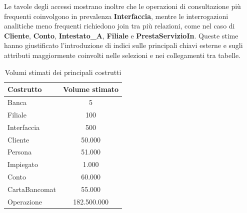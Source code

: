 Le tavole degli accessi mostrano inoltre che le operazioni di consultazione più frequenti coinvolgono in prevalenza \textbf{Interfaccia}, mentre le interrogazioni analitiche meno frequenti richiedono join tra più relazioni, come nel caso di \textbf{Cliente}, \textbf{Conto}, \textbf{Intestato\_A}, \textbf{Filiale} e \textbf{PrestaServizioIn}. Queste stime hanno giustificato l'introduzione di indici sulle principali chiavi esterne e sugli attributi maggiormente coinvolti nelle selezioni e nei collegamenti tra tabelle.

\begin{table}[H]
  \centering
  \begin{tabular}{|l|c|}
    \hline
    Costrutto & Volume stimato \\
    \hline
    Banca & 5 \\
    Filiale & 100 \\
    Interfaccia & 500 \\
    Cliente & 50{.}000 \\
    Persona & 51{.}000 \\
    Impiegato & 1{.}000 \\
    Conto & 60{.}000 \\
    CartaBancomat & 55{.}000 \\
    Operazione & 182{.}500{.}000 \\
    \hline
  \end{tabular}
  \caption{Volumi stimati dei principali costrutti}
\end{table}

